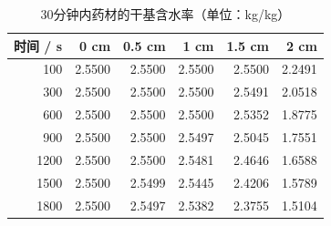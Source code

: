 \begin{table}[htbp]
\caption{30分钟内药材的干基含水率（单位：kg/kg）}\label{tab:required-2}
\centering
\small
\begin{tabular}{rrrrrr}
\toprule
时间 / s & 0 cm & 0.5 cm & 1 cm & 1.5 cm & 2 cm \\
\midrule
100 & 2.5500 & 2.5500 & 2.5500 & 2.5500 & 2.2491 \\
300 & 2.5500 & 2.5500 & 2.5500 & 2.5491 & 2.0518 \\
600 & 2.5500 & 2.5500 & 2.5500 & 2.5352 & 1.8775 \\
900 & 2.5500 & 2.5500 & 2.5497 & 2.5045 & 1.7551 \\
1200 & 2.5500 & 2.5500 & 2.5481 & 2.4646 & 1.6588 \\
1500 & 2.5500 & 2.5499 & 2.5445 & 2.4206 & 1.5789 \\
1800 & 2.5500 & 2.5497 & 2.5382 & 2.3755 & 1.5104 \\
\bottomrule
\end{tabular}
\end{table}

